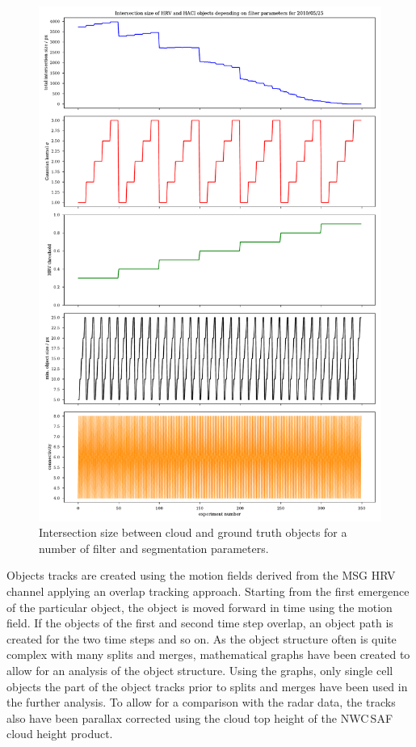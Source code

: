 \begin{figure}[htbp]
\centering
\includegraphics[height=\textheight]{Grafiken/Abbildungen/parameter_plot.pdf}
\caption{Intersection size between cloud and ground truth objects for a number of filter and segmentation parameters.}
\label{fig:filter-parameters}
\end{figure}

Objects tracks are created using the motion fields derived from the MSG HRV channel applying an overlap tracking approach. Starting from the first emergence of the particular object, the object is moved forward in time using the motion field. If the objects of the first and second time step overlap, an object path is created for the two time steps and so on. As the object structure often is quite complex with many splits and merges, mathematical graphs have been created to allow for an analysis of the object structure. Using the graphs, only single cell objects the part of the object tracks prior to splits and merges have been used in the further analysis. To allow for a comparison with the radar data, the tracks also have been parallax corrected using the cloud top height of the NWC\,SAF cloud height product.

